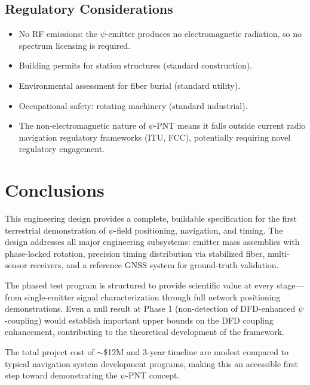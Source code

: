 \documentclass[11pt,a4paper]{article}
\begin{document}
\subsection{Regulatory Considerations}

\begin{itemize}
\item No RF emissions: the $\psi$-emitter produces no electromagnetic
  radiation, so no spectrum licensing is required.
\item Building permits for station structures (standard construction).
\item Environmental assessment for fiber burial (standard utility).
\item Occupational safety: rotating machinery (standard industrial).
\item The non-electromagnetic nature of $\psi$-PNT means it falls outside
  current radio navigation regulatory frameworks (ITU, FCC), potentially
  requiring novel regulatory engagement.
\end{itemize}

\section{Conclusions}

This engineering design provides a complete, buildable specification for
the first terrestrial demonstration of $\psi$-field positioning,
navigation, and timing. The design addresses all major engineering
subsystems: emitter mass assemblies with phase-locked rotation, precision
timing distribution via stabilized fiber, multi-sensor receivers, and a
reference GNSS system for ground-truth validation.

The phased test program is structured to provide scientific value at
every stage---from single-emitter signal characterization through full
network positioning demonstrations. Even a null result at Phase 1
(non-detection of DFD-enhanced $\psi$-coupling) would establish important
upper bounds on the DFD coupling enhancement, contributing to the
theoretical development of the framework.

The total project cost of $\sim$\$12M and 3-year timeline are modest
compared to typical navigation system development programs, making this
an accessible first step toward demonstrating the $\psi$-PNT concept.
\end{document}
